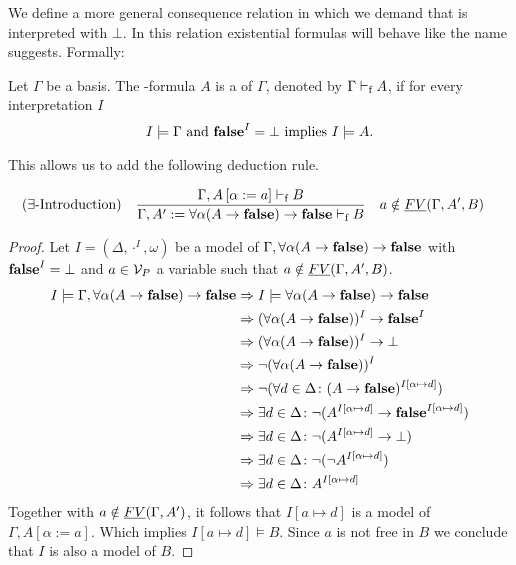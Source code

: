 We define a more general consequence relation in which we demand that \false{} is interpreted with $\bot$. In this relation existential formulas will behave like the name suggests. Formally:
\begin{definition}\label{def.3.3}
Let $\Gamma$ be a basis. The \SysP-formula $A$ is a  of $\Gamma$, denoted by $\Gamma\vdash_\text{f} A$, if for every interpretation $I$
\[I\models\Gamma \text{ and } \textbf{false}^I=\bot\text{ implies }I\models A.\]

This allows us to add the following deduction rule.
\begin{mdframed}
	\begin{align*}
		  & (\exists\text{-Introduction}) &   & \frac 
		{\Gamma,A\left[\alpha:=a\right]\PModelsf B}
		{\Gamma,A':=\forall\alpha(A\to\false)\to\false\PModelsf B} && a\notin\emph{FV}(\Gamma,A',B) %
	\end{align*}
\end{mdframed}
\end{definition}
\begin{proof}
	Let $I=(\Delta,\cdot^I,\omega)$ be a model of $\Gamma,\forall\alpha(A\to\textbf{false})\to\textbf{false}$ with $\textbf{false}^I=\bot$ and $a\in\mathcal{V}_P$ a variable such that $a\notin\emph{FV}(\Gamma,A',B)$.
	\begin{align*}
		I\models\Gamma,\forall\alpha(A\to\textbf{false})\to\textbf{false} & \Rightarrow I\models\forall\alpha(A\to\textbf{false})\to\textbf{false}                                                          \\
        & \Rightarrow (\forall\alpha(A\to\textbf{false}))^I\to\textbf{false}^I                                                            \\
        & \Rightarrow (\forall\alpha(A\to\textbf{false}))^I\to\bot                                                                \\
        & \Rightarrow \neg(\forall\alpha(A\to\textbf{false}))^I                                                                   \\
        & \Rightarrow \neg(\forall d\in\Delta\colon(A\to\textbf{false})^{I\left[\alpha\mapsto d\right]})                               \\
        & \Rightarrow \exists d\in\Delta\colon\neg(A^{I\left[\alpha\mapsto d\right]}\to\textbf{false}^{I\left[\alpha\mapsto d\right]}) \\
        & \Rightarrow \exists d\in\Delta\colon\neg(A^{I\left[\alpha\mapsto d\right]}\to\bot)                                   \\
        & \Rightarrow \exists d\in\Delta\colon\neg(\neg A^{I\left[\alpha\mapsto d\right]})                                     \\
        & \Rightarrow \exists d\in\Delta\colon A^{I\left[\alpha\mapsto d\right]}
	\end{align*}
	Together with $a\notin\emph{FV}(\Gamma,A')$, it follows that $I\left[a\mapsto d\right]$ is a model of $\Gamma,A\left[\alpha:=a\right]$. Which implies $I\left[a\mapsto d\right]\models B$.	Since $a$ is not free in $B$ we conclude that $I$ is also a model of $B$.
\end{proof}
